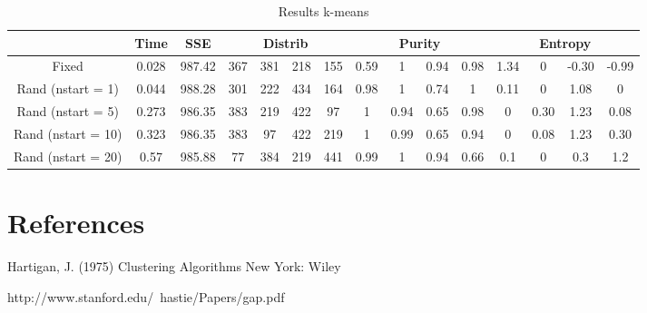 \documentclass[a4paper,11pt]{article}
\begin{document}
\begin{table}[ht!]
  \caption{Results k-means }
  \begin{centering}
    \begin{tabular}{|c|c|c|c|c|c|c|c|c|c|c|c|c|c|c|}
      \cline{2-15} 
      \multicolumn{1}{c|}{} & Time & SSE & \multicolumn{4}{c|}{Distrib} & \multicolumn{4}{c|}{Purity} & \multicolumn{4}{c|}{Entropy}\tabularnewline
      \hline 
      Fixed & 0.028 & 987.42 & 367 & 381 & 218 & 155 & 0.59 & 1 & 0.94 & 0.98 & 1.34 & 0 & -0.30 & -0.99\tabularnewline
      \hline 
      Rand (nstart = 1) & 0.044 & 988.28 & 301 & 222 & 434 & 164 & 0.98 & 1 & 0.74 & 1 & 0.11 & 0 & 1.08 & 0\tabularnewline
      \hline 
      Rand (nstart = 5) & 0.273 & 986.35 & 383 & 219 & 422 & 97 & 1 & 0.94 & 0.65 & 0.98 & 0 & 0.30 & 1.23 & 0.08\tabularnewline
      \hline 
      Rand (nstart = 10) & 0.323 & 986.35 & 383 & 97 & 422 & 219 & 1 & 0.99 & 0.65 & 0.94 & 0 & 0.08 & 1.23 & 0.30\tabularnewline
      \hline 
      Rand (nstart = 20) & 0.57 & 985.88 & 77 & 384 & 219 & 441 & 0.99 & 1 & 0.94 & 0.66 & 0.1 & 0 & 0.3 & 1.2\tabularnewline
      \hline 
    \end{tabular}
    \par\end{centering}
  
  
\end{table}

\section{References}
Hartigan, J. (1975) Clustering Algorithms New York: Wiley

http://www.stanford.edu/~hastie/Papers/gap.pdf
\end{document}
